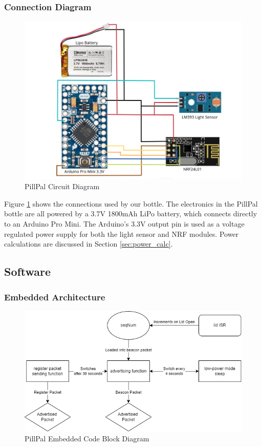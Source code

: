 \documentclass[sigconf]{acmart}
\begin{document}
\subsubsection{Connection Diagram}
\begin{figure}[h]
  \centering
  \includegraphics[width=\linewidth]{images/circuit_diagram.png}
  \caption{PillPal Circuit Diagram}
  \label{fig:circuit}
\end{figure}

Figure \ref{fig:circuit} shows the connections used by our bottle. The electronics in the PillPal bottle are all powered by a 3.7V 1800mAh LiPo battery, which connects directly to an Arduino Pro Mini. The Arduino's 3.3V output pin is used as a voltage regulated power supply for both the light sensor and NRF modules. Power calculations are discussed in Section \ref{sec:power_calc}.

\subsection{Software}
\subsubsection{Embedded Architecture}
\label{sec:embeded_arch}
\begin{figure}[h]
  \centering
  \includegraphics[width=\linewidth]{images/embedded_block.png}
  \caption{PillPal Embedded Code Block Diagram}
  \label{fig:em_block}
\end{figure}
\end{document}
